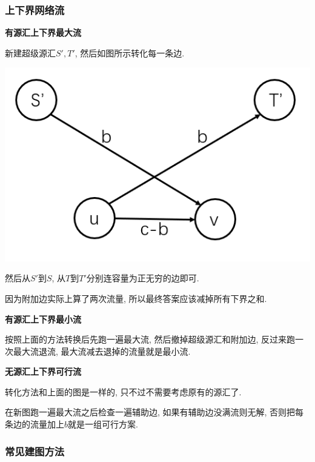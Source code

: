 \subsubsection{上下界网络流}

\textbf{有源汇上下界最大流}

新建超级源汇$S', T'$, 然后如图所示转化每一条边.

\includegraphics[scale = 0.5]{../src/graph/上下界网络流.png}

然后从$S'$到$S$, 从$T$到$T'$分别连容量为正无穷的边即可.

因为附加边实际上算了两次流量, 所以最终答案应该减掉所有下界之和.

\textbf{有源汇上下界最小流}

按照上面的方法转换后先跑一遍最大流, 然后撤掉超级源汇和附加边, 反过来跑一次最大流退流, 最大流减去退掉的流量就是最小流.

\textbf{无源汇上下界可行流}

转化方法和上面的图是一样的, 只不过不需要考虑原有的源汇了.

在新图跑一遍最大流之后检查一遍辅助边, 如果有辅助边没满流则无解, 否则把每条边的流量加上$b$就是一组可行方案.

\subsubsection{常见建图方法}


